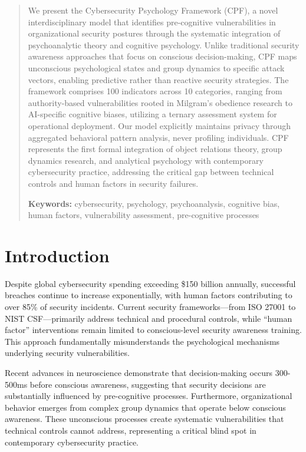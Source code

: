\documentclass[11pt,a4paper]{article}
\begin{document}
\begin{abstract}
\noindent
We present the Cybersecurity Psychology Framework (CPF), a novel interdisciplinary model that identifies pre-cognitive vulnerabilities in organizational security postures through the systematic integration of psychoanalytic theory and cognitive psychology. Unlike traditional security awareness approaches that focus on conscious decision-making, CPF maps unconscious psychological states and group dynamics to specific attack vectors, enabling predictive rather than reactive security strategies. The framework comprises 100 indicators across 10 categories, ranging from authority-based vulnerabilities rooted in Milgram's obedience research to AI-specific cognitive biases, utilizing a ternary assessment system for operational deployment. Our model explicitly maintains privacy through aggregated behavioral pattern analysis, never profiling individuals. CPF represents the first formal integration of object relations theory, group dynamics research, and analytical psychology with contemporary cybersecurity practice, addressing the critical gap between technical controls and human factors in security failures.

\vspace{0.5em}
\noindent\textbf{Keywords:} cybersecurity, psychology, psychoanalysis, cognitive bias, human factors, vulnerability assessment, pre-cognitive processes
\end{abstract}

\vspace{1cm}

\section{Introduction}

Despite global cybersecurity spending exceeding \$150 billion annually\cite{gartner2023}, successful breaches continue to increase exponentially, with human factors contributing to over 85\% of security incidents\cite{verizon2023}. Current security frameworks—from ISO 27001 to NIST CSF—primarily address technical and procedural controls, while ``human factor'' interventions remain limited to conscious-level security awareness training\cite{sans2023}. This approach fundamentally misunderstands the psychological mechanisms underlying security vulnerabilities.

Recent advances in neuroscience demonstrate that decision-making occurs 300-500ms before conscious awareness\cite{libet1983, soon2008}, suggesting that security decisions are substantially influenced by pre-cognitive processes. Furthermore, organizational behavior emerges from complex group dynamics that operate below conscious awareness\cite{bion1961, kernberg1998}. These unconscious processes create systematic vulnerabilities that technical controls cannot address, representing a critical blind spot in contemporary cybersecurity practice.
\end{document}
